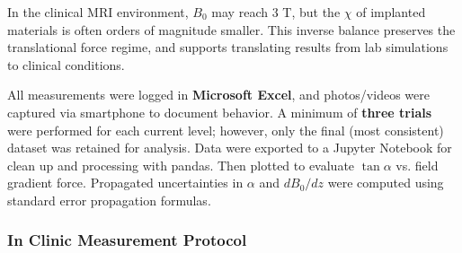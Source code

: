 In the clinical MRI environment, $B_0$ may reach 3 T, but the $\chi$ of implanted materials is often orders of magnitude smaller. This inverse balance preserves the translational force regime, and supports translating results from lab simulations to clinical conditions.


All measurements were logged in \textbf{Microsoft Excel}, and photos/videos were captured via smartphone to document behavior. A minimum of \textbf{three trials} were performed for each current level; however, only the final (most consistent) dataset was retained for analysis. Data were exported to a Jupyter Notebook for clean up and processing with pandas. Then plotted to evaluate $\tan \alpha$ vs. field gradient force. Propagated uncertainties in $\alpha$ and $dB_0/dz$ were computed using standard error propagation formulas.

\subsubsection{In Clinic Measurement Protocol}


